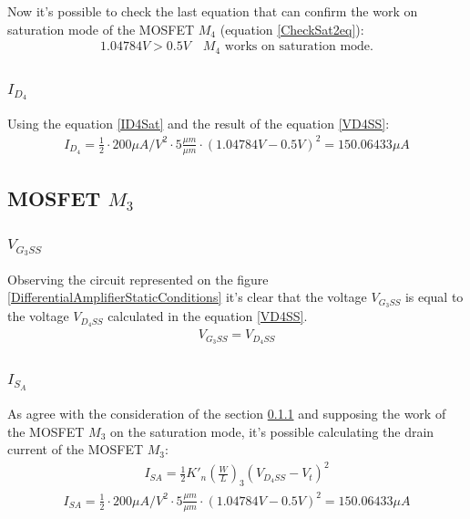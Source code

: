 Now it's possible to check the last equation that can confirm the work on saturation mode of the MOSFET $M_4$ (equation \ref{CheckSat2eq}):
\begin{align}
1.04784V > 0.5V \quad M_4 \text{ works on saturation mode.} \label{M4SatConfirm}
\end{align}

\subsubsection{$I_{D_4}$}
Using the equation \ref{ID4Sat} and the result of the equation \ref{VD4SS}:
\begin{align}
I_{D_4} = \frac{1}{2}\cdot 200 \mu A/V^2\cdot 5 \frac{\mu m}{\mu m} \cdot \left(1.04784V -0.5V \right)^2 = 150.06433 \mu A \label{ID4SatResult}
\end{align}

\subsection{MOSFET $M_3$}
\subsubsection{$V_{G_3SS}$}\label{VG3SS}
Observing the circuit represented on the figure \ref{DifferentialAmplifierStaticConditions} it's clear that the voltage $V_{G_3SS}$  is equal to the voltage $V_{D_4SS}$ calculated in the equation \ref{VD4SS}.
\begin{align}
V_{G_3SS} = V_{D_4SS}
\end{align}

\subsubsection{$I_{S_A}$}
As agree with the consideration of the section \ref{VG3SS} and supposing the work of the MOSFET $M_3$ on the saturation mode, it's possible calculating the drain current of the MOSFET $M_3$:\\

\begin{align}
I_{SA} = \frac{1}{2}{K'}_n \left(\frac{W}{L}\right)_3 (V_{D_4SS} - V_t)^2
\end{align}
\begin{align}
I_{SA} = \frac{1}{2}\cdot 200 \mu A/V^2\cdot 5 \frac{\mu m}{\mu m} \cdot \left(1.04784V -0.5V \right)^2 = 150.06433 \mu A \label{ISASat}
\end{align}

